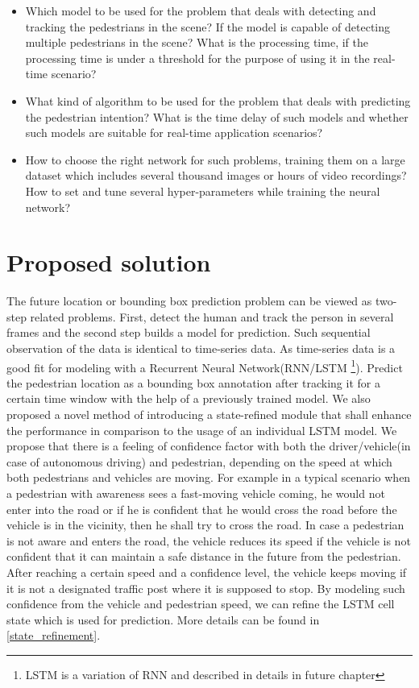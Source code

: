 \begin{itemize}
	\item Which model to be used for the problem that deals with detecting and tracking the pedestrians in the scene? If the model is capable of detecting multiple pedestrians in the scene? What is the processing time, if the processing time is under a threshold for the purpose of using it in the real-time scenario?

	\item 
What kind of algorithm to be used for the problem that deals with predicting the pedestrian intention? What is the time delay of such models and whether such models are suitable for real-time application scenarios?

	\item How to choose the right network for such problems, training them on a large dataset which includes several thousand images or hours of video recordings? How to set and tune several hyper-parameters while training the neural network? 

\end{itemize}

\section{Proposed solution}
The future location or bounding box prediction problem can be viewed as two-step related problems. First, detect the human and track the person in several frames and the second step builds a model for prediction. Such sequential observation of the data is identical to time-series data. As time-series data is a good fit for modeling with a Recurrent Neural Network(RNN/LSTM \footnote{LSTM is a variation of RNN and described in details in future chapter}). Predict the pedestrian location as a bounding box annotation after tracking it for a certain time window with the help of a previously trained model. 
\newpara
We also proposed a novel method of introducing a state-refined module that shall enhance the performance in comparison to the usage of an individual LSTM model. 
We propose that there is a feeling of confidence factor with both the driver/vehicle(in case of autonomous driving) and pedestrian, depending on the speed at which both pedestrians and vehicles are moving. For example in a typical scenario when a pedestrian with awareness sees a fast-moving vehicle coming, he would not enter into the road or if he is confident that he would cross the road before the vehicle is in the vicinity, then he shall try to cross the road. In case a pedestrian is not aware and enters the road, the vehicle reduces its speed if the vehicle is not confident that it can maintain a safe distance in the future from the pedestrian. After reaching a certain speed and a confidence level, the vehicle keeps moving if it is not a designated traffic post where it is supposed to stop. By modeling such confidence from the vehicle and pedestrian speed, we can refine the LSTM cell state which is used for prediction. More details can be found in \ref{state_refinement}.



